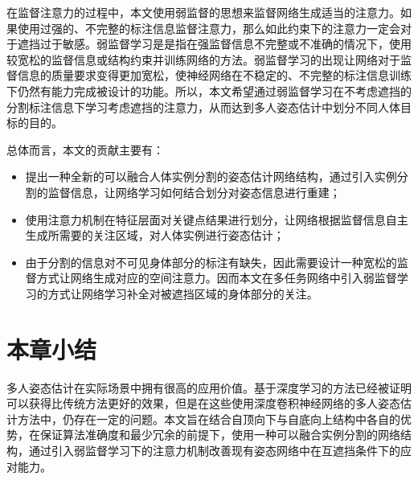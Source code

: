 在监督注意力的过程中，本文使用弱监督的思想来监督网络生成适当的注意力。如果使用过强的、不完整的标注信息监督注意力，那么如此约束下的注意力一定会对于遮挡过于敏感。弱监督学习是是指在强监督信息不完整或不准确的情况下，使用较宽松的监督信息或结构约束并训练网络的方法\cite{10.1093/nsr/nwx106}。弱监督学习的出现让网络对于监督信息的质量要求变得更加宽松，使神经网络在不稳定的、不完整的标注信息训练下仍然有能力完成被设计的功能。所以，本文希望通过弱监督学习在不考虑遮挡的分割标注信息下学习考虑遮挡的注意力，从而达到多人姿态估计中划分不同人体目标的目的。

总体而言，本文的贡献主要有：
\begin{itemize}
	\item 提出一种全新的可以融合人体实例分割的姿态估计网络结构，通过引入实例分割的监督信息，让网络学习如何结合划分对姿态信息进行重建；
	\item 使用注意力机制在特征层面对关键点结果进行划分，让网络根据监督信息自主生成所需要的关注区域，对人体实例进行姿态估计；
	\item 由于分割的信息对不可见身体部分的标注有缺失，因此需要设计一种宽松的监督方式让网络生成对应的空间注意力。因而本文在多任务网络中引入弱监督学习的方式让网络学习补全对被遮挡区域的身体部分的关注。
\end{itemize}

\section{本章小结}
\label{sec:introconclusion}
多人姿态估计在实际场景中拥有很高的应用价值。基于深度学习的方法已经被证明可以获得比传统方法更好的效果，但是在这些使用深度卷积神经网络的多人姿态估计方法中，仍存在一定的问题。本文旨在结合自顶向下与自底向上结构中各自的优势，在保证算法准确度和最少冗余的前提下，使用一种可以融合实例分割的网络结构，通过引入弱监督学习下的注意力机制改善现有姿态网络中在互遮挡条件下的应对能力。
